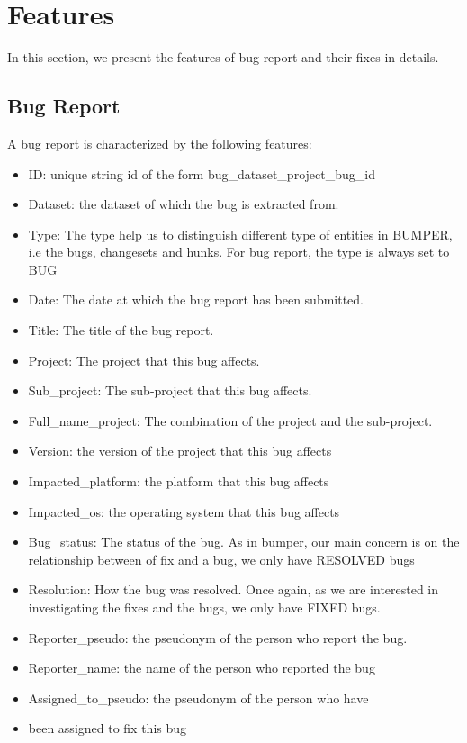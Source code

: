 \section{Features}

In this section, we present the features of bug report and their fixes in details.

\subsection{Bug Report}

A bug report is characterized by the following features:


\begin{itemize}

\item ID: unique string id of the form bug\_dataset\_project\_bug\_id
\item Dataset: the dataset of which the bug is extracted from.
\item Type: The type help us to distinguish different type of entities in BUMPER, i.e the bugs, changesets and hunks. For bug report, the type is always set to BUG
\item Date: The date at which the bug report has been submitted.
\item Title: The title of the bug report.
\item Project: The project that this bug affects.
\item Sub\_project: The sub-project that this bug affects.
\item Full\_name\_project: The combination of the project and the sub-project.
\item Version: the version of the project that this bug affects
\item Impacted\_platform: the platform that this bug affects
\item Impacted\_os: the operating system that this bug affects
\item Bug\_status: The status of the bug. As in bumper, our main concern is on the relationship between of fix and a bug, we only have RESOLVED bugs
\item Resolution: How the bug was resolved. Once again, as we are interested in investigating the fixes and the bugs, we only have FIXED bugs.
\item Reporter\_pseudo: the pseudonym of the person who report the bug.
\item Reporter\_name: the name of the person who reported the bug
\item Assigned\_to\_pseudo: the pseudonym of the person who have \item been assigned to fix this bug

\end{itemize}
